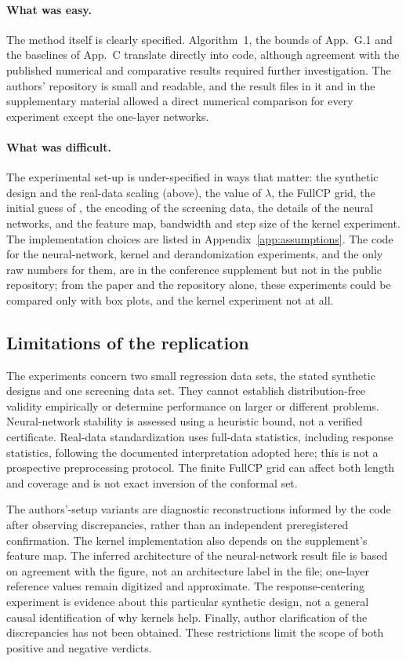 \paragraph{What was easy.} The method itself is clearly specified. Algorithm~1, the bounds of App.~G.1 and the
baselines of App.~C translate directly into code, although agreement with the published numerical and comparative results required further investigation. The authors' repository is small and readable, and the result files in it and in the supplementary material
allowed a direct numerical comparison for every experiment except the one-layer networks.

\paragraph{What was difficult.} The experimental set-up is under-specified in ways that matter: the synthetic design
and the real-data scaling (above), the value of $\lambda$, the FullCP grid, the initial guess of \RO, the encoding of
the screening data, the details of the neural networks, and the feature map, bandwidth and step size of the kernel
experiment. The implementation choices are listed in Appendix~\ref{app:assumptions}. The code for the neural-network,
kernel and derandomization experiments, and the only raw numbers for them, are in the conference supplement but not
in the public repository; from the paper and the repository alone, these experiments could be compared only with box
plots, and the kernel experiment not at all.

\subsection{Limitations of the replication}

The experiments concern two small regression data sets, the stated synthetic designs and one screening data set. They cannot establish distribution-free validity empirically or determine performance on larger or different problems. Neural-network stability is assessed using a heuristic bound, not a verified certificate. Real-data standardization uses full-data statistics, including response statistics, following the documented interpretation adopted here; this is not a prospective preprocessing protocol. The finite FullCP grid can affect both length and coverage and is not exact inversion of the conformal set.

The authors'-setup variants are diagnostic reconstructions informed by the code after observing discrepancies, rather than an independent preregistered confirmation. The kernel implementation also depends on the supplement's feature map. The inferred architecture of the neural-network result file is based on agreement with the figure, not an architecture label in the file; one-layer reference values remain digitized and approximate. The response-centering experiment is evidence about this particular synthetic design, not a general causal identification of why kernels help. Finally, author clarification of the discrepancies has not been obtained. These restrictions limit the scope of both positive and negative verdicts.

